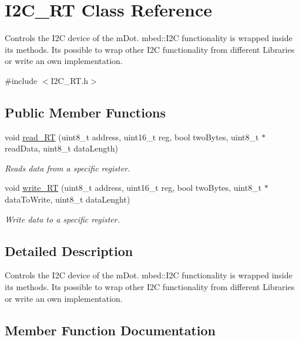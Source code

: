 \hypertarget{class_i2_c___r_t}{}\section{I2\+C\+\_\+\+R\+T Class Reference}
\label{class_i2_c___r_t}


Controls the I2\+C device of the m\+Dot. mbed\+::\+I2\+C functionality is wrapped inside it\textquotesingle{}s methods. It\textquotesingle{}s possible to wrap other I2\+C functionality from different Libraries or write an own implementation.  




{\ttfamily \#include $<$I2\+C\+\_\+\+R\+T.\+h$>$}

\subsection*{Public Member Functions}
\begin{DoxyCompactItemize}
\item 
void \hyperlink{class_i2_c___r_t_ad443d0f425844171b78bfeccfe0b5d68}{read\+\_\+\+R\+T} (uint8\+\_\+t address, uint16\+\_\+t reg, bool two\+Bytes, uint8\+\_\+t $\ast$read\+Data, uint8\+\_\+t data\+Length)
\begin{DoxyCompactList}\small\item\em Reads data from a specific register. \end{DoxyCompactList}\item 
void \hyperlink{class_i2_c___r_t_a08527ac5db07d11f83d9cc2ceeab9bce}{write\+\_\+\+R\+T} (uint8\+\_\+t address, uint16\+\_\+t reg, bool two\+Bytes, uint8\+\_\+t $\ast$data\+To\+Write, uint8\+\_\+t data\+Lenght)
\begin{DoxyCompactList}\small\item\em Write data to a specific register. \end{DoxyCompactList}\end{DoxyCompactItemize}


\subsection{Detailed Description}
Controls the I2\+C device of the m\+Dot. mbed\+::\+I2\+C functionality is wrapped inside it\textquotesingle{}s methods. It\textquotesingle{}s possible to wrap other I2\+C functionality from different Libraries or write an own implementation. 

\subsection{Member Function Documentation}
\hypertarget{class_i2_c___r_t_ad443d0f425844171b78bfeccfe0b5d68}{}
